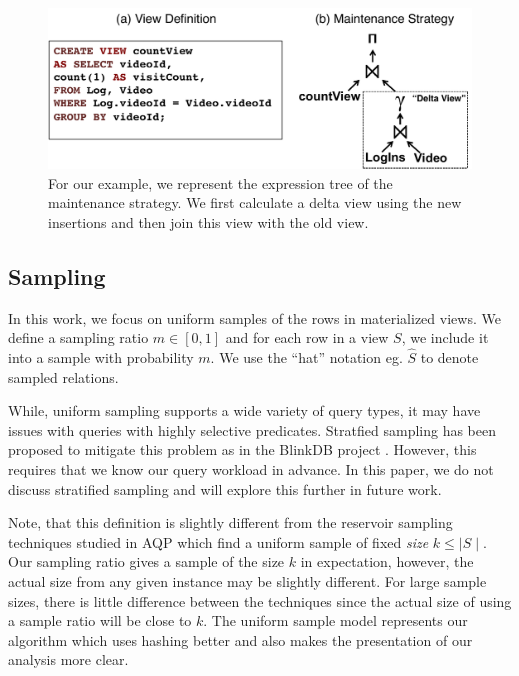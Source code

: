 \begin{figure}[t] \vspace{-2em}
\centering
 \includegraphics[scale=0.32]{figs/example_expression_tree.pdf} \vspace{-.25em}
 \caption{For our example, we represent the expression tree of the maintenance strategy. We first calculate a delta view using the new insertions and then join this view with the old view.\label{exexpr}}\vspace{-1.75em}
\end{figure}

\subsection{Sampling}
In this work, we focus on uniform samples of the rows in materialized views.
We define a sampling ratio $m\in [0,1]$ and for each row in a view $S$, we include it into a sample with probability $m$.
We use the ``hat'' notation eg. $\hat{S}$ to denote sampled relations. 

While, uniform sampling supports a wide variety of query types, it may have issues with queries with highly selective predicates.
Stratfied sampling has been proposed to mitigate this problem as in the BlinkDB project \cite{AgarwalMPMMS13}.
However, this requires that we know our query workload in advance.  
In this paper, we do not discuss stratified sampling and will explore this further in future work.

\iffalse
Note, that this definition is slightly different from the reservoir sampling techniques studied in AQP \cite{DBLP:journals/toms/Vitter85} which find a uniform sample of fixed \emph{size} $k\le \mid S \mid$.
Our sampling ratio gives a sample of the size $k$ in expectation, however, the actual size from any given instance may be slightly different.
For large sample sizes, there is little difference between the techniques since the actual size of using a sample ratio will be close to $k$.
The uniform sample model represents our algorithm which uses hashing better and also makes the presentation of our analysis more clear.

